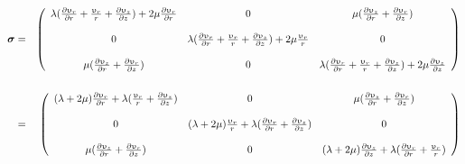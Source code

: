 \begin{eqnarray}
{\bm \sigma}
&=&
\left(
\begin{array}{ccc}
\lambda({\partial  \upupsilon_r \over \partial  r}
+{\upupsilon_r \over r} +{\partial  \upupsilon_{z} \over \partial z}) +
2\mu {\partial  \upupsilon_r \over \partial  r} &
0 & \mu({\partial \upupsilon_{z} \over \partial  r} + {\partial \upupsilon_r \over \partial z} ) \\
\\
0 & \lambda({\partial \upupsilon_r \over \partial r}
+{\upupsilon_r \over r} +{\partial \upupsilon_{z} \over \partial z}) + 2\mu{\upupsilon_r \over r} & 0 \\
\\
\mu({\partial \upupsilon_{z} \over \partial r} + 
{\partial \upupsilon_r \over \partial z} )&0 & 
\lambda({\partial \upupsilon_r \over \partial r}
+{\upupsilon_r \over r} +{\partial \upupsilon_{z} \over \partial z}) +
2\mu{\partial  \upupsilon_{z} \over \partial z}
\end{array}
\right) \nonumber\\ \nonumber\\
&=&
\left(
\begin{array}{ccc}
(\lambda+ 2\mu) {\partial \upupsilon_r \over \partial r}
+\lambda ({\upupsilon_r \over r} +{\partial  \upupsilon_{z} \over \partial z})  &
0 &
\mu({\partial \upupsilon_{z} \over \partial  r} + 
{\partial \upupsilon_r \over \partial z} ) \\
\\
0 &
(\lambda+2\mu) \frac{\upupsilon_r}{r}
+ \lambda({\partial  \upupsilon_r \over \partial r}
+{\partial \upupsilon_{z} \over \partial z}) &
0 \\
\\
\mu({\partial \upupsilon_{z} \over \partial r} + 
{\partial \upupsilon_r \over \partial z} ) &
0 &
(\lambda+2\mu) \frac{\partial \upupsilon_z}{\partial z}
+\lambda({\partial \upupsilon_r \over \partial r}
+{\upupsilon_r \over r} ) 
\end{array}
\right) \nonumber
\end{eqnarray}

